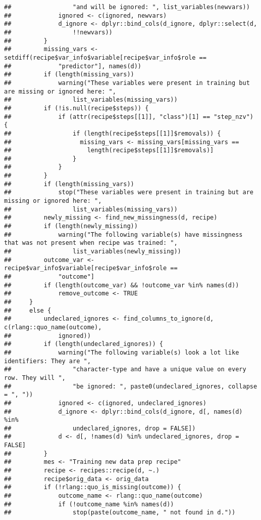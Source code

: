 \documentclass[
]{article}
\begin{document}
\begin{verbatim}
##                 "and will be ignored: ", list_variables(newvars))
##             ignored <- c(ignored, newvars)
##             d_ignore <- dplyr::bind_cols(d_ignore, dplyr::select(d, 
##                 !!newvars))
##         }
##         missing_vars <- setdiff(recipe$var_info$variable[recipe$var_info$role == 
##             "predictor"], names(d))
##         if (length(missing_vars)) 
##             warning("These variables were present in training but are missing or ignored here: ", 
##                 list_variables(missing_vars))
##         if (!is.null(recipe$steps)) {
##             if (attr(recipe$steps[[1]], "class")[1] == "step_nzv") {
##                 if (length(recipe$steps[[1]]$removals)) {
##                   missing_vars <- missing_vars[missing_vars == 
##                     length(recipe$steps[[1]]$removals)]
##                 }
##             }
##         }
##         if (length(missing_vars)) 
##             stop("These variables were present in training but are missing or ignored here: ", 
##                 list_variables(missing_vars))
##         newly_missing <- find_new_missingness(d, recipe)
##         if (length(newly_missing)) 
##             warning("The following variable(s) have missingness that was not present when recipe was trained: ", 
##                 list_variables(newly_missing))
##         outcome_var <- recipe$var_info$variable[recipe$var_info$role == 
##             "outcome"]
##         if (length(outcome_var) && !outcome_var %in% names(d)) 
##             remove_outcome <- TRUE
##     }
##     else {
##         undeclared_ignores <- find_columns_to_ignore(d, c(rlang::quo_name(outcome), 
##             ignored))
##         if (length(undeclared_ignores)) {
##             warning("The following variable(s) look a lot like identifiers: They are ", 
##                 "character-type and have a unique value on every row. They will ", 
##                 "be ignored: ", paste0(undeclared_ignores, collapse = ", "))
##             ignored <- c(ignored, undeclared_ignores)
##             d_ignore <- dplyr::bind_cols(d_ignore, d[, names(d) %in% 
##                 undeclared_ignores, drop = FALSE])
##             d <- d[, !names(d) %in% undeclared_ignores, drop = FALSE]
##         }
##         mes <- "Training new data prep recipe"
##         recipe <- recipes::recipe(d, ~.)
##         recipe$orig_data <- orig_data
##         if (!rlang::quo_is_missing(outcome)) {
##             outcome_name <- rlang::quo_name(outcome)
##             if (!outcome_name %in% names(d)) 
##                 stop(paste(outcome_name, " not found in d."))

\end{verbatim}
\end{document}
